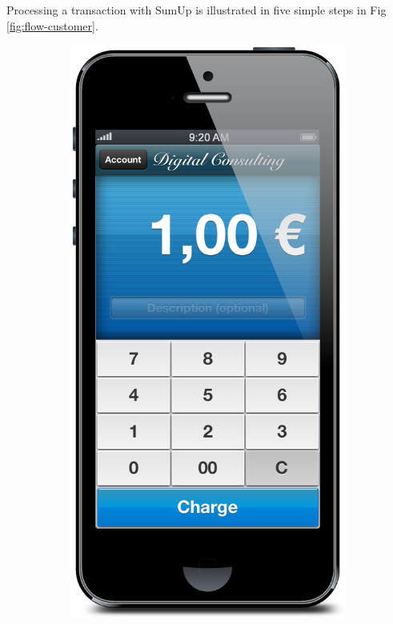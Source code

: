 \documentclass[a4paper, oneside]{csthesis}
\begin{document}
Processing a transaction with SumUp is illustrated in five simple steps in Fig \ref{fig:flow-customer}.

\begin{figure}
        \centering
        \renewcommand*\thesubfigure{\arabic{subfigure}}
        \begin{subfigure}[b]{0.16\textwidth}
                \centering
                \includegraphics[width=\textwidth]{figures/flow1.png}

\end{subfigure}
\end{figure}
\end{document}
